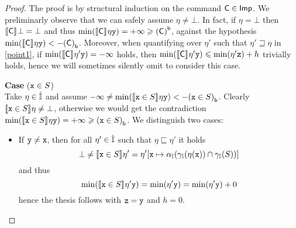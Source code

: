 \begin{proof}
   The proof is by
  structural induction on the command \(\com\in \imp\).
  We preliminarly observe that we can safely assume
  \(\eta \neq \bot\).
  In fact, if \(\eta = \bot\) then \(\semi{\com} \bot = \bot\) and
  thus \(\min(\semi{\com} \eta \var[y]) = +\infty \geq \bound{\com}\),
  against the hypothesis
  \(\min(\semi{\com}\eta \var[y]) < -\lbound{\com}\). Moreover, when
  quantifying over \(\eta'\) such that \(\eta' \sqsupseteq \eta\) in
  \ref{point1}, if \(\min(\semi{\com}\eta' \var[y]) = - \infty\)
  holds, then
  \(\min(\semi{\com}\eta' \var[y]) \leq \min(\eta' \var[z]) + h\)
  trivially holds, hence we will sometimes silently omit to consider
  this case.
  
  \medskip
  
  \noindent
  \textbf{Case} (\(\var \in S\))\\
  Take \(\eta \in \inte\) and assume
  \(-\infty\neq\min(\semi{\var \in S}\eta \var[y]) < - \lbound{\var \in S}\).
  Clearly \(\semi{\var \in S}\eta \neq \bot\), otherwise we would get
  the contradiction
  \(\min(\semi{\var \in S}\eta \var[y]) = +\infty \geq \lbound{\var
    \in S}\).  We distinguish two cases:
  \begin{itemize}
    
  \item If \(\var[y] \neq \var\), then for all \(\eta' \in \inte\) such
    that \(\eta \sqsubseteq \eta'\) it holds
    \[\bot \neq \semi{\var \in S}\eta' = \eta'[\var \mapsto
      {\abstr[\Int](\concr[\Int](\eta(\var)) \cap \concr[\Int](S))}]\]
    and thus
    \begin{equation*}
      \min(\semi{\var \in S}\eta' \var[y]) = \min(\eta' \var[y]) = \min(\eta' \var[y]) + 0
    \end{equation*}
    hence the thesis follows with \(\var[z]=\var[y]\) and \(h = 0\).


\end{itemize}
\end{proof}
